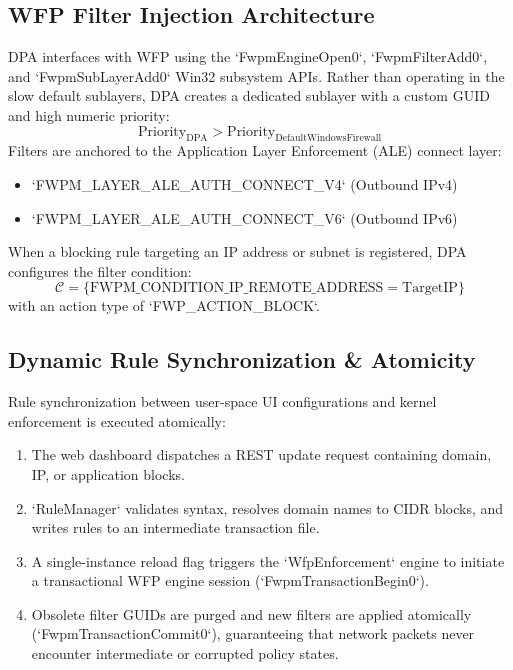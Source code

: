 \documentclass[conference]{IEEEtran}
\begin{document}
\subsection{WFP Filter Injection Architecture}
DPA interfaces with WFP using the `FwpmEngineOpen0`, `FwpmFilterAdd0`, and `FwpmSubLayerAdd0` Win32 subsystem APIs. Rather than operating in the slow default sublayers, DPA creates a dedicated sublayer with a custom GUID and high numeric priority:
\begin{equation}
\text{Priority}_{\text{DPA}} > \text{Priority}_{\text{DefaultWindowsFirewall}}
\end{equation}
Filters are anchored to the Application Layer Enforcement (ALE) connect layer:
\begin{itemize}
    \item `FWPM_LAYER_ALE_AUTH_CONNECT_V4` (Outbound IPv4)
    \item `FWPM_LAYER_ALE_AUTH_CONNECT_V6` (Outbound IPv6)
\end{itemize}
When a blocking rule targeting an IP address or subnet is registered, DPA configures the filter condition:
\begin{equation}
\mathcal{C} = \{ \text{FWPM\_CONDITION\_IP\_REMOTE\_ADDRESS} = \text{TargetIP} \}
\end{equation}
with an action type of `FWP_ACTION_BLOCK`.

\subsection{Dynamic Rule Synchronization \& Atomicity}
Rule synchronization between user-space UI configurations and kernel enforcement is executed atomically:
\begin{enumerate}
    \item The web dashboard dispatches a REST update request containing domain, IP, or application blocks.
    \item `RuleManager` validates syntax, resolves domain names to CIDR blocks, and writes rules to an intermediate transaction file.
    \item A single-instance reload flag triggers the `WfpEnforcement` engine to initiate a transactional WFP engine session (`FwpmTransactionBegin0`).
    \item Obsolete filter GUIDs are purged and new filters are applied atomically (`FwpmTransactionCommit0`), guaranteeing that network packets never encounter intermediate or corrupted policy states.
\end{enumerate}
\end{document}
